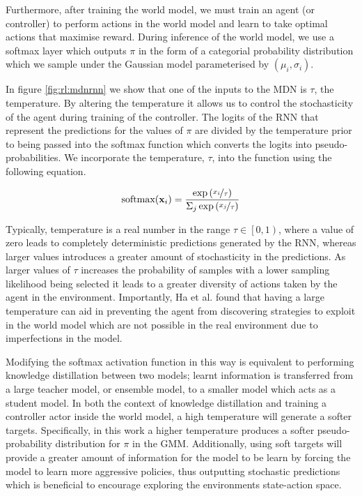 Furthermore, after training the world model, we must train an agent (or controller) to perform actions in the world model and learn to take optimal actions that maximise reward. During inference of the world model, we use a softmax layer which outputs $\pi$ in the form of a categorial probability distribution which we sample under the Gaussian model parameterised by $(\mu_i, \sigma_i)$.

In figure \ref{fig:rl:mdnrnn} we show that one of the inputs to the MDN is $\tau$, the temperature. By altering the temperature it allows us to control the stochasticity of the agent during training of the controller. The logits of the RNN that represent the predictions for the values of $\pi$ are divided by the temperature prior to being passed into the softmax function which converts the logits into pseudo-probabilities. We incorporate the temperature, $\tau$, into the function using the following equation.

$$
\text{softmax}(\mathbf{x}_i) = \frac{\exp\left( \nicefrac{x_i}{\tau} \right) }{\Sigma_j \exp \left( \nicefrac{x_j}{\tau} \right) }
$$

Typically, temperature is a real number in the range $\tau \in \left[ 0, 1 \right)$, where a value of zero leads to completely deterministic predictions generated by the RNN, whereas larger values introduces a greater amount of stochasticity in the predictions. As larger values of $\tau$ increases the probability of samples with a lower sampling likelihood being selected it leads to a greater diversity of actions taken by the agent in the environment. Importantly, Ha et al. \cite{ha2018worldmodels} found that having a large temperature can aid in preventing the agent from discovering strategies to exploit in the world model which are not possible in the real environment due to imperfections in the model.

Modifying the softmax activation function in this way is equivalent to performing knowledge distillation between two models; learnt information is transferred from a large teacher model, or ensemble model, to a smaller model which acts as a student model. In both the context of knowledge distillation and training a controller actor inside the world model, a high temperature will generate a softer targets. Specifically, in this work a higher temperature produces a softer pseudo-probability distribution for $\pi$ in the GMM. Additionally, using soft targets will provide a greater amount of information for the model to be learn by forcing the model to learn more aggressive policies, thus outputting stochastic predictions which is beneficial to encourage exploring the environments state-action space.

